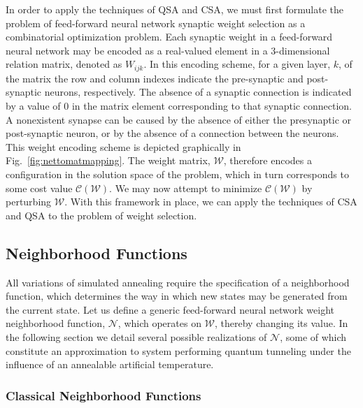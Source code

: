\documentclass[10pt,journal,cspaper,compsoc]{IEEEtran}
\begin{document}
In order to apply the techniques of QSA and CSA, we must first formulate the problem of feed-forward neural network synaptic weight selection as a combinatorial optimization problem. Each synaptic weight in a feed-forward neural network may be encoded as a real-valued element in a 3-dimensional relation matrix, denoted as $\mathit{W}_{ijk}$. In this encoding scheme, for a given layer, $k$, of the matrix the row and column indexes indicate the pre-synaptic and post-synaptic neurons, respectively. The absence of a synaptic connection is indicated by a value of $0$ in the matrix element corresponding to that synaptic connection. A nonexistent synapse can be caused by the absence of either the presynaptic or post-synaptic neuron, or by the absence of a connection between the neurons. This weight encoding scheme is depicted graphically in Fig.~\ref{fig:nettomatmapping}. The weight matrix, $\boldsymbol{\mathcal{W}}$, therefore encodes a configuration in the solution space of the problem, which in turn corresponds to some cost value $\mathcal{C}(\boldsymbol{\mathcal{W}})$. We may now attempt to minimize $\mathcal{C}(\boldsymbol{\mathcal{W}})$ by perturbing $\boldsymbol{\mathcal{W}}$. With this framework in place, we can apply the techniques of CSA and QSA to the problem of weight selection.


\subsection{Neighborhood Functions}
\label{scn:neighborhood_fuctions}

All variations of simulated annealing require the specification of a neighborhood function, which determines the way in which new states may be generated from the current state. Let us define a generic  feed-forward neural network weight neighborhood function, $\mathcal{N}$, which operates on $\boldsymbol{\mathcal{W}}$, thereby changing its value. In the following section we detail several possible realizations of $\mathcal{N}$, some of which constitute an approximation to system performing quantum tunneling under the influence of an annealable artificial temperature.


\subsubsection{Classical Neighborhood Functions}
\label{scn:classical_neighborhood}
\end{document}
